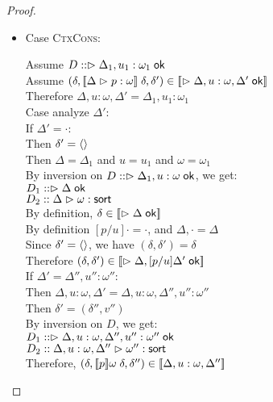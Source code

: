 \begin{proof}
\begin{enumerate}
\begin{itemize}
      \item Case \textsc{CtxCons}: 
        \begin{tabbedproof}
          \oo Assume $D :: \judgeACtx{\Delta_1, u_1:\omega_1}$ \\
          \oo Assume $(\delta, \interp{\judgeA[\Delta]{p}{\omega}}\;\delta, \delta') \in 
                       \interp{\judgeACtx{\Delta, u:\omega, \Delta'}}$ \\
          \ooo Therefore $\Delta, u:\omega, \Delta' = \Delta_1, u_1:\omega_1$ \\
          \ooo Case analyze $\Delta'$: \\
          \oooo If $\Delta' = \cdot$: \\
          \ooooo Then $\delta' = \unit$ \\
          \ooooo Then $\Delta = \Delta_1$ and $u = u_1$ and $\omega = \omega_1$ \\
          \ooooo By inversion on $D :: \judgeACtx{\Delta_1, u:\omega}$, we get:\\
          \oooooo $D_1 :: \judgeACtx{\Delta}$ \\
          \oooooo $D_2 :: \judgeSort[\Delta]{\omega}$ \\
          \ooooo By definition, $\delta \in \interp{\judgeACtx{\Delta}}$ \\
          \ooooo By definition $[p/u]\cdot = \cdot$, and $\Delta, \cdot = \Delta$ \\
          \ooooo Since $\delta' = \unit$, we have $(\delta, \delta') = \delta$ \\
          \ooooo Therefore $(\delta, \delta') \in \interp{\judgeACtx{\Delta, [p/u]\Delta'}}$ \\
          \oooo If $\Delta' = \Delta'', u'':\omega''$: \\
          \ooooo Then $\Delta, u:\omega, \Delta' = \Delta, u:\omega, \Delta'', u'':\omega''$ \\
          \ooooo Then $\delta' = (\delta'', v'')$ \\
          \ooooo By inversion on $D$, we get: \\
          \oooooo $D_1 :: \judgeACtx{\Delta, u:\omega, \Delta'', u'':\omega''}$ \\
          \oooooo $D_2 :: \judgeSort[{\Delta, u:\omega, \Delta''}]{\omega''}$ \\
          \ooooo Therefore, $(\delta, \interp{p}{\omega}\;\delta, \delta'') \in 
                             \interp{\Delta, u:\omega, \Delta''}$ \\

\end{tabbedproof}
\end{itemize}
\end{enumerate}
\end{proof}
